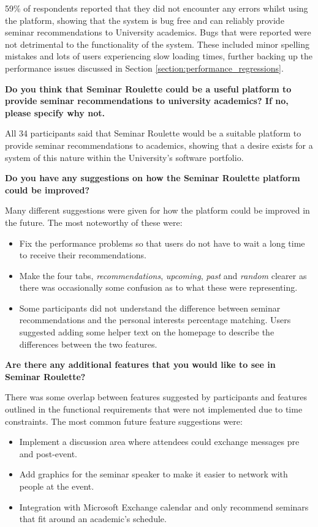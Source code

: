 \documentclass{l4proj}
\begin{document}
59\% of respondents reported that they did not encounter any errors whilst using the platform, showing that the system is bug free and can reliably provide seminar recommendations to University academics. Bugs that were reported were not detrimental to the functionality of the system. These included minor spelling mistakes and lots of users experiencing slow loading times, further backing up the performance issues discussed in Section \ref{section:performance_regressions}.

\textbf{Do you think that Seminar Roulette could be a useful platform to provide seminar recommendations to university academics? If no, please specify why not.}

All 34 participants said that Seminar Roulette would be a suitable platform to provide seminar recommendations to academics, showing that a desire exists for a system of this nature within the University's software portfolio.

\textbf{Do you have any suggestions on how the Seminar Roulette platform could be improved?}

Many different suggestions were given for how the platform could be improved in the future. The most noteworthy of these were: 

\begin{itemize}
    \item Fix the performance problems so that users do not have to wait a long time to receive their recommendations.
    \item Make the four tabs, \emph{recommendations}, \emph{upcoming}, \emph{past} and \emph{random} clearer as there was occasionally some confusion as to what these were representing.
    \item Some participants did not understand the difference between seminar recommendations and the personal interests percentage matching. Users suggested adding some helper text on the homepage to describe the differences between the two features.
\end{itemize}

\textbf{Are there any additional features that you would like to see in Seminar Roulette?}

There was some overlap between features suggested by participants and features outlined in the functional requirements that were not implemented due to time constraints. The most common future feature suggestions were:

\begin{itemize}
    \item Implement a discussion area where attendees could exchange messages pre and post-event.
    \item Add graphics for the seminar speaker to make it easier to network with people at the event.
    \item Integration with Microsoft Exchange calendar and only recommend seminars that fit around an academic's schedule.
\end{itemize}
\end{document}
